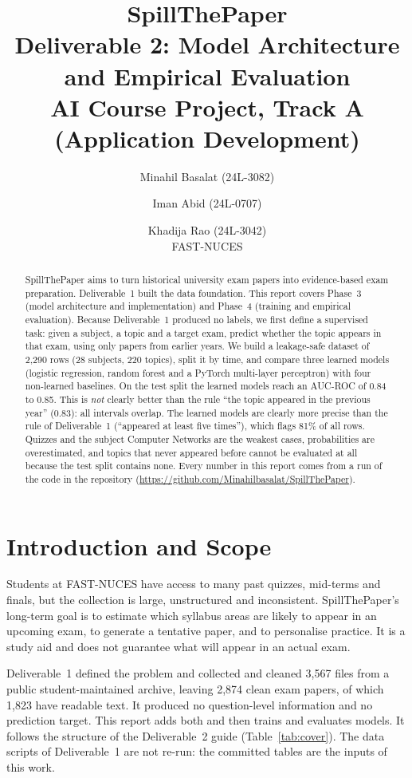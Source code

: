 \documentclass[11pt,a4paper]{article}
\title{\textbf{SpillThePaper}\\[2pt]
\large Deliverable 2: Model Architecture and Empirical Evaluation\\[2pt]
\normalsize AI Course Project, Track A (Application Development)}
\author{Minahil Basalat (24L-3082) \and Iman Abid (24L-0707) \and Khadija Rao (24L-3042)\\[3pt]
FAST-NUCES}
\date{}
\begin{document}
\maketitle

\begin{abstract}
SpillThePaper aims to turn historical university exam papers into evidence-based exam preparation.
Deliverable~1 built the data foundation. This report covers Phase~3 (model architecture and implementation) and
Phase~4 (training and empirical evaluation). Because Deliverable~1 produced no labels, we first define a supervised
task: given a subject, a topic and a target exam, predict whether the topic appears in that exam, using only papers
from earlier years. We build a leakage-safe dataset of 2{,}290 rows (28 subjects, 220 topics), split it by time, and
compare three learned models (logistic regression, random forest and a PyTorch multi-layer perceptron) with four
non-learned baselines. On the test split the learned models reach an AUC-ROC of 0.84 to 0.85. This is
\emph{not} clearly better than the rule ``the topic appeared in the previous year'' (0.83): all intervals overlap.
The learned models are clearly more precise than the rule of Deliverable~1 (``appeared at least five times''), which
flags 81\% of all rows. Quizzes and the subject Computer Networks are the weakest cases, probabilities are
overestimated, and topics that never appeared before cannot be evaluated at all because the test split contains none.
Every number in this report comes from a run of the code in the repository
(\url{https://github.com/Minahilbasalat/SpillThePaper}).
\end{abstract}

\tableofcontents

\section{Introduction and Scope}
\label{sec:intro}

Students at FAST-NUCES have access to many past quizzes, mid-terms and finals, but the collection is large,
unstructured and inconsistent. SpillThePaper's long-term goal is to estimate which syllabus areas are likely to
appear in an upcoming exam, to generate a tentative paper, and to personalise practice. It is a study aid and does
not guarantee what will appear in an actual exam.

Deliverable~1 defined the problem and collected and cleaned 3{,}567 files from a public student-maintained archive,
leaving 2{,}874 clean exam papers, of which 1{,}823 have readable text. It produced no question-level information
and no prediction target. This report adds both and then trains and evaluates models. It follows the structure of
the Deliverable~2 guide (Table~\ref{tab:cover}). The data scripts of Deliverable~1 are not re-run: the committed
tables are the inputs of this work.
\end{document}
